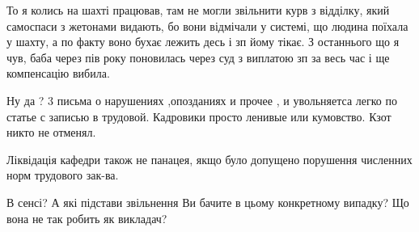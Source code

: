 \begin{itemize}
То я колись на шахті працював, там не могли звільнити курв з відділку, який самоспаси з жетонами видають, бо вони відмічали у системі, що людина поїхала у шахту, а по факту воно бухає лежить десь і зп йому тікає.
З останнього що я чув, баба через пів року поновилась через суд з виплатою зп за весь час і ще компенсацію вибила.

Ну да ? 3 письма о нарушениях ,опозданиях и прочее , и увольняетса легко по статье с записью в трудовой. Кадровики просто ленивые или кумовство. Кзот никто не отменял.

Ліквідація кафедри також не панацея, якщо було допущено порушення численних норм трудового зак-ва.

В сенсі? А які підстави звільнення Ви бачите в цьому конкретному випадку? Що вона не так робить як викладач?

\end{itemize} %
